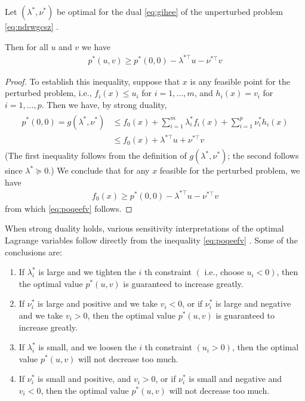 \documentclass{article}
\begin{document}
Let $\left(\lambda^{* }, \nu^{* }\right)$ be optimal for the dual \cref{eq:gihee} of the unperturbed problem \cref{eq:ndrwgcsz} . 


Then for all $u$ and $v$ we have
\begin{align}
p^{* }(u, v) \geq p^{* }(0,0)-\lambda^{*  \top} u-\nu^{*  \top} v\label{eq:poqeefv}
\end{align}
\begin{proof}\color{ForestGreen}
To establish this inequality, suppose that $x$ is any feasible point for the perturbed problem, i.e., $f_{i}(x) \leq u_{i}$ for $i=1, \ldots, m$, and $h_{i}(x)=v_{i}$ for $i=1, \ldots, p$. Then we have, by strong duality,
\begin{align*}
\begin{aligned}
p^{* }(0,0)=g\left(\lambda^{* }, \nu^{* }\right) & \leq f_{0}(x)+\sum_{i=1}^{m} \lambda_{i}^{* } f_{i}(x)+\sum_{i=1}^{p} \nu_{i}^{* } h_{i}(x) \\
& \leq f_{0}(x)+\lambda^{*  \top} u+\nu^{*  \top} v
\end{aligned}
\end{align*}
(The first inequality follows from the definition of $g\left(\lambda^{* }, \nu^{* }\right)$; the second follows since $\lambda^{* } \succeq 0$.) We conclude that for any $x$ feasible for the perturbed problem, we have
\begin{align*}
f_{0}(x) \geq p^{* }(0,0)-\lambda^{*  \top} u-\nu^{*  \top} v
\end{align*}
from which  \cref{eq:poqeefv} follows.
\end{proof}

When strong duality holds, various sensitivity interpretations of the optimal Lagrange variables follow directly from the inequality \cref{eq:poqeefv} . Some of the conclusions are:
\begin{enumerate}
    \item If $\lambda_{i}^{* }$ is large and we tighten the $i$ th constraint $\left(\right.$ i.e., choose $\left.u_{i}<0\right)$, then the optimal value $p^{* }(u, v)$ is guaranteed to increase greatly.
    \item If $\nu_{i}^{* }$ is large and positive and we take $v_{i}<0$, or if $\nu_{i}^{* }$ is large and negative and we take $v_{i}>0$, then the optimal value $p^{* }(u, v)$ is guaranteed to increase greatly.
    \item If $\lambda_{i}^{* }$ is small, and we loosen the $i$ th constraint $\left(u_{i}>0\right)$, then the optimal value $p^{* }(u, v)$ will not decrease too much.
    \item If $\nu_{i}^{* }$ is small and positive, and $v_{i}>0$, or if $\nu_{i}^{* }$ is small and negative and $v_{i}<0$, then the optimal value $p^{* }(u, v)$ will not decrease too much.
\end{enumerate}
\end{document}
